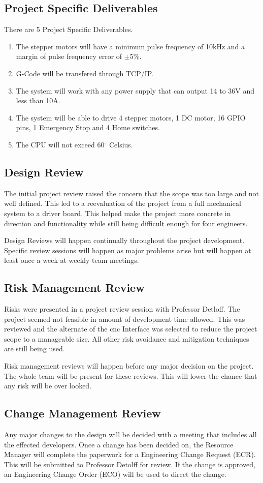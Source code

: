 \subsection{Project Specific Deliverables}
There are 5 Project Specific Deliverables.
	\begin{enumerate}
		\item  The stepper motors will have a minimum pulse frequency of 10kHz and a margin of pulse frequency error of  $\pm $5\%.
		\item G-Code will be transfered through TCP/IP.
		\item The system will work with any power supply that can output 14 to 36V and less than 10A.
		\item The system will be able to drive 4 stepper motors, 1 DC motor, 16 GPIO pins, 1 Emergency Stop and 4 Home switches.
		\item The CPU will not exceed 60$^\circ$ Celsius. 
	\end{enumerate}
\subsection{Design Review}
The initial project review raised the concern that the scope was too large and not well defined.
This led to a reevaluation of the project from a full mechanical system to a driver board.
This helped make the project more concrete in direction and functionality while still being difficult enough for four engineers.

Design Reviews will happen continually throughout the project development. 
Specific review sessions will happen as major problems arise but will happen at least once a week at weekly team meetings.
\subsection{Risk Management Review}
Risks were presented in a project review session with Professor Detloff.
The project seemed not feasible in amount of development time allowed.
This was reviewed and the alternate of the \gls{cnc} Interface was selected to reduce the project scope to a manageable size. 
All other risk avoidance and mitigation techniques are still being used.   

Risk management reviews will happen before any major decision on the project.
The whole team will be present for these reviews. 
This will lower the chance that any risk will be over looked.
\subsection{Change Management Review}
Any major changes to the design will be decided with a meeting that includes all the effected developers.
Once a change has been decided on, the Resource Manager will complete the paperwork for a Engineering Change Request (ECR).
This will be submitted to Professor Detolff for review.
If the change is approved, an Engineering Change Order (ECO) will be used to direct the change.


